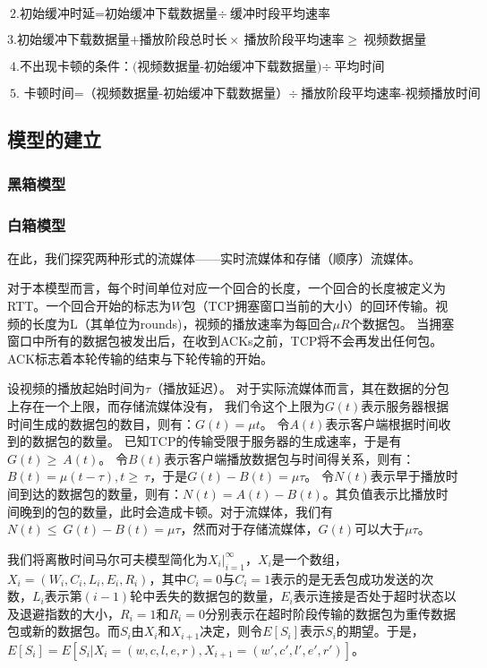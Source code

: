 \documentclass[UTF8]{ctexart}
\begin{document}
$ \text{2.初始缓冲时延=初始缓冲下载数据量} \div\ \text{缓冲时段平均速率} $

$ \text{3.初始缓冲下载数据量+播放阶段总时长} \times\ \text{播放阶段平均速率}\geq\ \text{视频数据量} $

$ \text{4.不出现卡顿的条件：(视频数据量-初始缓冲下载数据量)} \div\ \text{平均时间} $

$ \text{5. 卡顿时间=（视频数据量-初始缓冲下载数据量）}\div\ \text{播放阶段平均速率-视频播放时间} $
\subsection{模型的建立}
\subsubsection{黑箱模型}
\subsubsection{白箱模型}
在此，我们探究两种形式的流媒体——实时流媒体和存储（顺序）流媒体。

对于本模型而言，每个时间单位对应一个回合的长度，一个回合的长度被定义为RTT。一个回合开始的标志为$ W $包（TCP拥塞窗口当前的大小）的回环传输。视频的长度为L（其单位为rounds)，视频的播放速率为每回合$ \mu R $个数据包。
当拥塞窗口中所有的数据包被发出后，在收到ACKs之前，TCP将不会再发出任何包。ACK标志着本轮传输的结束与下轮传输的开始。

设视频的播放起始时间为\( \tau \)（播放延迟）。
对于实际流媒体而言，其在数据的分包上存在一个上限，而存储流媒体没有，
我们令这个上限为\( G(t) \)表示服务器根据时间生成的数据包的数目，则有：\( G(t)= \mu t\)。
令\( A(t) \)表示客户端根据时间收到的数据包的数量。
已知TCP的传输受限于服务器的生成速率，于是有\( G(t)\geq\ A(t)\)。
令\(B(t)\)表示客户端播放数据包与时间得关系，则有：\( B(t)=\mu(t-\tau),t\geq\ \tau \)，于是\(G(t)-B(t)=\mu \tau \)。
令$ N(t) $表示早于播放时间到达的数据包的数量，则有：$ N(t)=A(t)-B(t)$。其负值表示比播放时间晚到的包的数量，此时会造成卡顿。对于流媒体，我们有$ N(t)\leq\ G(t)-B(t)=\mu \tau $，然而对于存储流媒体，$ G(t)$可以大于$ \mu \tau$。

我们将离散时间马尔可夫模型简化为$ X_i|_{i=1}^\infty $，$ X_i $是一个数组，$ X_i=(W_i,C_i,L_i,E_i,R_i) $，其中$ C_i=0 $与$ C_i=1 $表示的是无丢包成功发送的次数，$ L_i $表示第$(i-1)$轮中丢失的数据包的数量，$ E_i $表示连接是否处于超时状态以及退避指数的大小，$ R_i=1 $和$ R_i=0 $分别表示在超时阶段传输的数据包为重传数据包或新的数据包。而$ S_i $由$ X_i $和$ X_{i+1} $决定，则令$ E[S_i] $表示$ S_i $的期望。于是，$ E[S_i]=E[S_i|X_i=(w,c,l,e,r),X_{i+1}=(w',c',l',e',r')] $。
\end{document}
